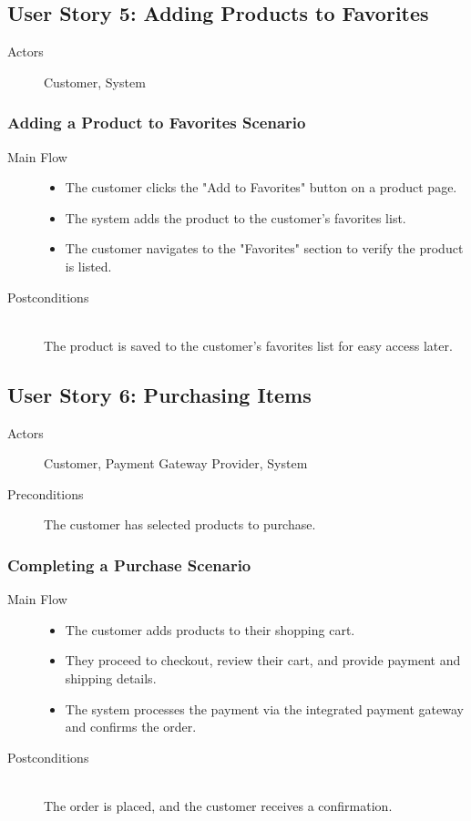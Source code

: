 \documentclass[a4paper,journal]{IEEEtran}
\begin{document}
\subsection{User Story 5: Adding Products to Favorites}
\begin{description}
  \item[Actors] Customer, System
\end{description}
\subsubsection{Adding a Product to Favorites Scenario}
\begin{description}
  \item[Main Flow] \hfill
    \begin{itemize}
      \item The customer clicks the "Add to Favorites" button on a product page.
      \item The system adds the product to the customer's favorites list.
      \item The customer navigates to the "Favorites" section to verify the
        product is listed.
    \end{itemize}
  \item[Postconditions] \hfill \\
    The product is saved to the customer's favorites list for easy access later.
\end{description}

\subsection{User Story 6: Purchasing Items}
\begin{description}
  \item[Actors] Customer, Payment Gateway Provider, System
  \item[Preconditions] \hfill
    The customer has selected products to purchase.
\end{description}
\subsubsection{Completing a Purchase Scenario}
\begin{description}
  \item[Main Flow] \hfill
    \begin{itemize}
      \item The customer adds products to their shopping cart.
      \item They proceed to checkout, review their cart, and provide payment and
        shipping details.
      \item The system processes the payment via the integrated payment gateway
        and confirms the order.
    \end{itemize}
  \item[Postconditions] \hfill \\
    The order is placed, and the customer receives a confirmation.
\end{description}
\end{document}
